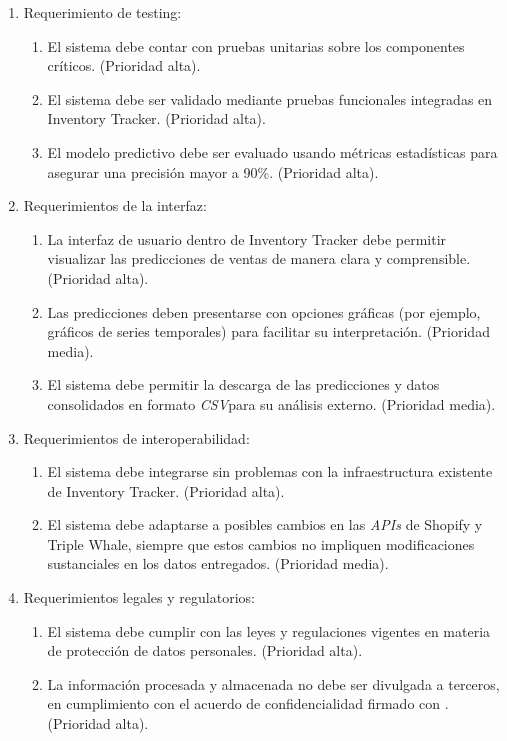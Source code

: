 \documentclass[
11pt, %
]{charter}
\begin{document}
\begin{enumerate}
\begin{enumerate}
		\end{enumerate}
	\item Requerimiento de testing:
		\begin{enumerate}
			\item El sistema debe contar con pruebas unitarias sobre los componentes críticos. (Prioridad alta).
			\item El sistema debe ser validado mediante pruebas funcionales integradas en Inventory Tracker. (Prioridad alta).
			\item El modelo predictivo debe ser evaluado usando métricas estadísticas para asegurar una precisión mayor a 90\%. (Prioridad alta).
		\end{enumerate}
	\item Requerimientos de la interfaz:
		\begin{enumerate}  
			\item La interfaz de usuario dentro de Inventory Tracker debe permitir visualizar las predicciones de ventas de manera clara y comprensible. (Prioridad alta).
			\item Las predicciones deben presentarse con opciones gráficas (por ejemplo, gráficos de series temporales) para facilitar su interpretación. (Prioridad media).
			\item El sistema debe permitir la descarga de las predicciones y datos consolidados en formato \textit{CSV}para su análisis externo. (Prioridad media).
		\end{enumerate}

	\item Requerimientos de interoperabilidad:  
		\begin{enumerate}  
		\item El sistema debe integrarse sin problemas con la infraestructura existente de Inventory Tracker. (Prioridad alta).
		\item El sistema debe adaptarse a posibles cambios en las \textit{APIs} de Shopify y Triple Whale, siempre que estos cambios no impliquen modificaciones sustanciales en los datos entregados. (Prioridad media). 
		\end{enumerate}  
	
	\item Requerimientos legales y regulatorios:
		\begin{enumerate}  
		\item El sistema debe cumplir con las leyes y regulaciones vigentes en materia de protección de datos personales. (Prioridad alta).
		\item La información procesada y almacenada no debe ser divulgada a terceros, en cumplimiento con el acuerdo de confidencialidad firmado con \empclientename. (Prioridad alta).
		\end{enumerate} 

\end{enumerate}
\end{document}
